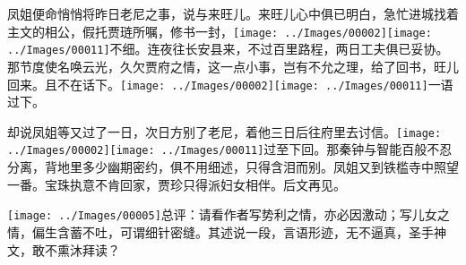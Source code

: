 凤姐便命悄悄将昨日老尼之事，说与来旺儿。来旺儿心中俱已明白，急忙进城找着主文的相公，假托贾琏所嘱，修书一封，{\texttt{[image: ../Images/00002]}\texttt{[image: ../Images/00011]}\footnotesize \kaishu 不细。}连夜往长安县来，不过百里路程，两日工夫俱已妥协。那节度使名唤云光，久欠贾府之情，这一点小事，岂有不允之理，给了回书，旺儿回来。且不在话下。{\texttt{[image: ../Images/00002]}\texttt{[image: ../Images/00011]}\footnotesize \kaishu 一语过下。}

却说凤姐等又过了一日，次日方别了老尼，着他三日后往府里去讨信。{\texttt{[image: ../Images/00002]}\texttt{[image: ../Images/00011]}\footnotesize \kaishu 过至下回。}那秦钟与智能百般不忍分离，背地里多少幽期密约，俱不用细述，只得含泪而别。凤姐又到铁槛寺中照望一番。宝珠执意不肯回家，贾珍只得派妇女相伴。后文再见。

{\texttt{[image: ../Images/00005]}\kaishu 总评：请看作者写势利之情，亦必因激动；写儿女之情，偏生含蓄不吐，可谓细针密缝。其述说一段，言语形迹，无不逼真，圣手神文，敢不熏沐拜读？}

%
